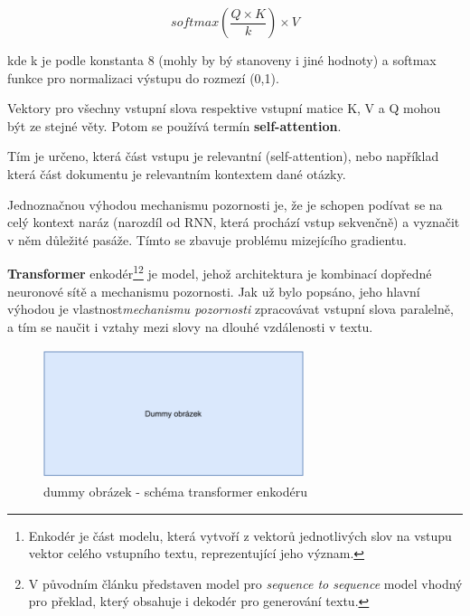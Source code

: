\begin{equation}
    \label{attention_dot_product}
    softmax(\frac{Q \times K}{k})\times V
\end{equation}

kde k je podle \cite{Transformers} konstanta 8 (mohly by bý stanoveny i jiné hodnoty) a softmax funkce pro normalizaci výstupu do rozmezí (0,1).\par
Vektory pro všechny vstupní slova respektive vstupní matice K, V a Q mohou být ze stejné věty. Potom se používá termín \textbf{self-attention}.\par
Tím je určeno, která část vstupu je relevantní (self-attention), nebo například která část dokumentu je relevantním kontextem dané otázky.\par
Jednoznačnou výhodou mechanismu pozornosti je, že je schopen podívat se na celý kontext naráz (narozdíl od RNN, která prochází vstup sekvenčně) a vyznačit v něm důležité pasáže. Tímto se zbavuje problému mizejícího gradientu.\par\medskip

\textbf{Transformer} enkodér\footnote{Enkodér je část modelu, která vytvoří z vektorů jednotlivých slov na vstupu vektor celého vstupního textu, reprezentující jeho význam.}\footnote{V původním článku představen model pro \emph{sequence to sequence} model vhodný pro překlad, který obsahuje i dekodér pro generování textu.} je model, jehož architektura je kombinací dopředné neuronové sítě a mechanismu pozornosti. Jak už bylo popsáno, jeho hlavní výhodou je vlastnost\linebreak \emph{mechanismu pozornosti} zpracovávat vstupní slova paralelně, a tím se naučit i vztahy mezi slovy na dlouhé vzdálenosti v textu.\par

\begin{figure}[hbt]
	\centering
	\includegraphics[width=3.0in, height=1.5in]{obrazky/dummy_pic.pdf}
	\caption{dummy obrázek - schéma transformer enkodéru}
	\label{transformer_encoder}
\end{figure}

